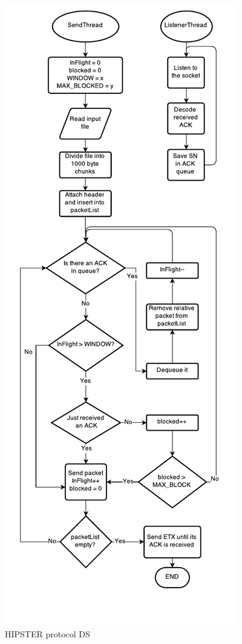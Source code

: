\documentclass[10pt,twocolumn]{article}
\begin{document}
\begin{figure}[htp]
  \centering
  \includegraphics[width=0.75\columnwidth, keepaspectratio]{Documentation/Sender.pdf}
  \caption{HIPSTER protocol DS}
  \label{fig:senderFlowchart}
\end{figure}
\end{document}
